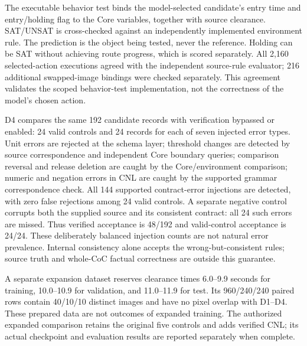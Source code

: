 \documentclass[11pt]{article}
\begin{document}
The executable behavior test binds the model-selected candidate's entry time
and entry/holding flag to the Core variables, together with source clearance.
SAT/UNSAT is cross-checked against an independently implemented environment rule.
The prediction is the object being tested, never the reference. Holding can be
SAT without achieving route progress, which is scored separately.
All 2,160 selected-action executions agreed with the independent source-rule
evaluator; 216 additional swapped-image bindings were checked separately.
This agreement validates the scoped behavior-test implementation, not the
correctness of the model's chosen action.

D4 compares the same 192 candidate records with verification bypassed or enabled:
24 valid controls and 24 records for each of seven injected error types. Unit
errors are rejected at the schema layer; threshold changes are detected by source
correspondence and independent Core boundary queries; comparison reversal and
release deletion are caught by the Core/environment comparison; numeric and
negation errors in CNL are caught by the supported grammar correspondence check.
All 144 supported contract-error injections are detected, with zero false
rejections among 24 valid controls. A separate negative control corrupts both
the supplied source and its consistent contract: all 24 such errors are missed.
Thus verified acceptance is 48/192 and valid-control acceptance is 24/24.
These deliberately balanced injection counts are not natural error prevalence.
Internal consistency alone accepts the wrong-but-consistent rules; source truth
and whole-CoC factual correctness are outside this guarantee.

A separate expansion dataset reserves clearance times 6.0--9.9 seconds for
training, 10.0--10.9 for validation, and 11.0--11.9 for test. Its 960/240/240 paired
rows contain 40/10/10 distinct images and have no pixel overlap with D1--D4.
These prepared data are not outcomes of expanded training. The authorized
expanded comparison retains the original five controls and adds verified CNL;
its actual checkpoint and evaluation results are reported separately when complete.
\end{document}
